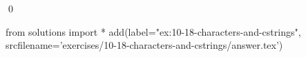 
\begin{ex}
  \label{ex:10-18-characters-and-cstrings}
  
  \qed
\end{ex}
\begin{python0}
from solutions import *
add(label="ex:10-18-characters-and-cstrings",
    srcfilename='exercises/10-18-characters-and-cstrings/answer.tex')
\end{python0}
